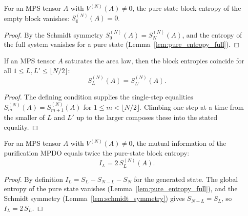 \begin{lemma}
    \label{lem:pure_block_entropy_empty}
    \leanok
    For an MPS tensor $A$ with $V^{(N)}(A)\neq 0$, the pure-state block entropy of the
    empty block vanishes: $S_0^{(N)}(A) = 0$.
\end{lemma}
\begin{proof}\leanok
    By the Schmidt symmetry $S_0^{(N)}(A) = S_{N}^{(N)}(A)$, and the entropy of the full
    system vanishes for a pure state (Lemma~\ref{lem:pure_entropy_full}).
\end{proof}

\begin{lemma}
    \label{lem:pure_sal_const}
    \leanok
    If an MPS tensor $A$ saturates the area law, then the block entropies
    coincide for all $1\le L, L'\le \lfloor N/2\rfloor$:
    \[
        S_L^{(N)}(A) = S_{L'}^{(N)}(A) .
    \]
\end{lemma}
\begin{proof}\leanok
    The defining condition supplies the single-step equalities
    $S_m^{(N)}(A) = S_{m+1}^{(N)}(A)$ for $1\le m<\lfloor N/2\rfloor$. Climbing one
    step at a time from the smaller of $L$ and $L'$ up to the larger composes these
    into the stated equality.
\end{proof}

\begin{lemma}
    \label{lem:mutual_info_doubled}
    \leanok
    For an MPS tensor $A$ with $V^{(N)}(A)\neq 0$, the mutual information of the
    purification MPDO equals twice the pure-state block entropy:
    \[
        I_L = 2\,S_L^{(N)}(A).
    \]
\end{lemma}
\begin{proof}\leanok
    By definition $I_L = S_L + S_{N-L} - S_N$ for the generated state. The global
    entropy of the pure state vanishes (Lemma~\ref{lem:pure_entropy_full}), and
    the Schmidt symmetry (Lemma~\ref{lem:schmidt_symmetry}) gives
    $S_{N-L} = S_L$, so $I_L = 2\,S_L$.
\end{proof}

